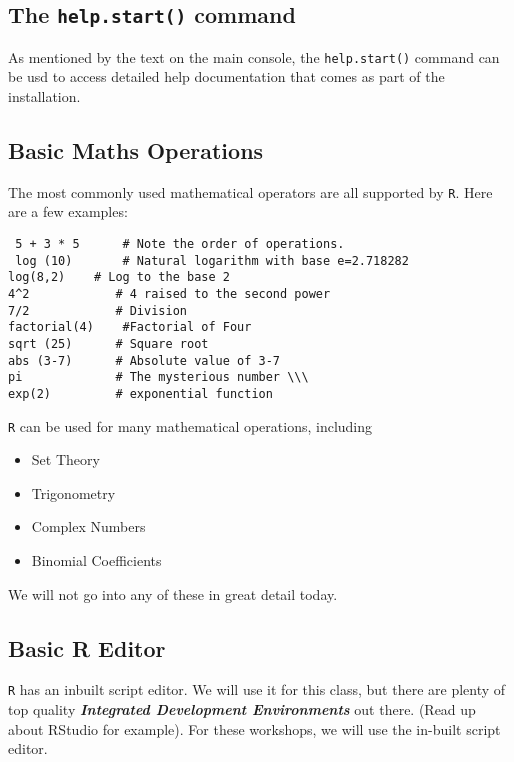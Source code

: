 \documentclass[a4paper,12pt]{article}
\begin{document}
\subsection{The \texttt{help.start()} command}
As mentioned by the text on the main console, the \texttt{help.start()} command can be usd to access detailed help documentation that comes as part of the installation.


\subsection{Basic Maths Operations}

The most commonly used mathematical operators are all supported by \texttt{R}. Here are a few examples: 
\begin{verbatim}
 5 + 3 * 5      # Note the order of operations. 
 log (10)       # Natural logarithm with base e=2.718282 
log(8,2)   	# Log to the base 2
4^2            # 4 raised to the second power 
7/2            # Division 
factorial(4) 	#Factorial of Four
sqrt (25)      # Square root 
abs (3-7)      # Absolute value of 3-7 
pi             # The mysterious number \\\
exp(2)         # exponential function 
\end{verbatim}

\texttt{R} can be used for many mathematical operations, including
\begin{itemize}
\item Set Theory
\item Trigonometry
\item Complex Numbers
\item Binomial Coefficients
\end{itemize}
We will not go into any of these in great detail today.

\subsection{Basic R Editor} %

\texttt{R} has an inbuilt script editor. We will use it for this class, but there are plenty of top quality \textbf{\textit{Integrated Development Environments}} out there. (Read up about RStudio for example).
For these workshops, we will use the in-built script editor.
\end{document}
